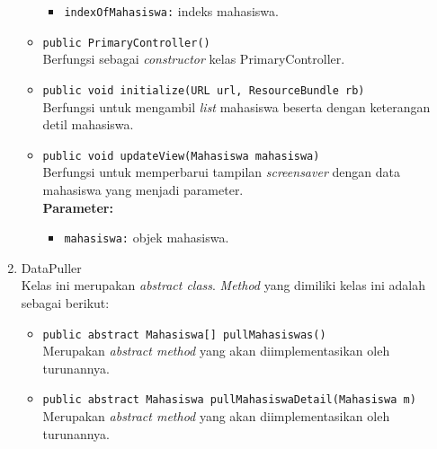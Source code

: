 \begin{enumerate}
\begin{itemize}
	\begin{itemize}
		\item \texttt{indexOfMahasiswa:} indeks mahasiswa.
	\end{itemize}
    \item \texttt{public PrimaryController()}\\
    Berfungsi sebagai \textit{constructor} kelas PrimaryController.
    \item \texttt{public void initialize(URL url, ResourceBundle rb)}\\
    Berfungsi untuk mengambil \textit{list} mahasiswa beserta dengan keterangan detil mahasiswa.
    \item \texttt{public void updateView(Mahasiswa mahasiswa)}\\
    Berfungsi untuk memperbarui tampilan \textit{screensaver} dengan data mahasiswa yang menjadi parameter. \\
    \textbf{Parameter:}
	\begin{itemize}
		\item \texttt{mahasiswa:} objek mahasiswa.
	\end{itemize}
\end{itemize}

\item{DataPuller}\\
\label{datapuller}
Kelas ini merupakan \textit{abstract class}. \textit{Method} yang dimiliki kelas ini adalah sebagai berikut:
\begin{itemize}
	\item \texttt{public abstract Mahasiswa[] pullMahasiswas()}\\
    Merupakan \textit{abstract method} yang akan diimplementasikan oleh turunannya.
	
	\item \texttt{public abstract Mahasiswa pullMahasiswaDetail(Mahasiswa m)}\\
    Merupakan \textit{abstract method} yang akan diimplementasikan oleh turunannya.
\end{itemize}
\end{enumerate}

